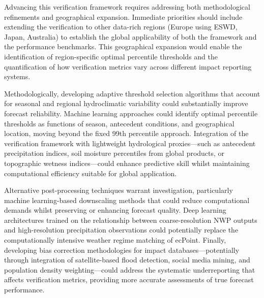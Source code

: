 Advancing this verification framework requires addressing both methodological refinements and geographical expansion. Immediate priorities should include extending the verification to other data-rich regions (Europe using ESWD, Japan, Australia) to establish the global applicability of both the framework and the performance benchmarks. This geographical expansion would enable the identification of region-specific optimal percentile thresholds and the quantification of how verification metrics vary across different impact reporting systems.

Methodologically, developing adaptive threshold selection algorithms that account for seasonal and regional hydroclimatic variability could substantially improve forecast reliability. Machine learning approaches could identify optimal percentile thresholds as functions of season, antecedent conditions, and geographical location, moving beyond the fixed 99th percentile approach. Integration of the verification framework with lightweight hydrological proxies—such as antecedent precipitation indices, soil moisture percentiles from global products, or topographic wetness indices—could enhance predictive skill whilst maintaining computational efficiency suitable for global application.

Alternative post-processing techniques warrant investigation, particularly machine learning-based downscaling methods that could reduce computational demands whilst preserving or enhancing forecast quality. Deep learning architectures trained on the relationship between coarse-resolution NWP outputs and high-resolution precipitation observations could potentially replace the computationally intensive weather regime matching of ecPoint. Finally, developing bias correction methodologies for impact databases—potentially through integration of satellite-based flood detection, social media mining, and population density weighting—could address the systematic underreporting that affects verification metrics, providing more accurate assessments of true forecast performance.